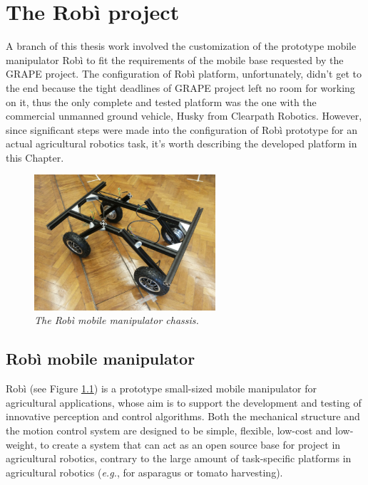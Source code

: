 
\chapter{The Robì project}\label{chap:robìProject}

A branch of this thesis work involved the customization of the prototype mobile manipulator Robì \parencite{robi} to fit the requirements of the mobile base requested by the \ac{GRAPE} project. The configuration of Robì platform, unfortunately, didn't get to the end because the tight deadlines of \ac{GRAPE} project left no room for working on it, thus the only complete and tested platform was the one with the commercial unmanned ground vehicle, Husky from Clearpath Robotics. However, since significant steps were made into the configuration of Robì prototype for an actual agricultural robotics task, it's worth describing the developed platform in this Chapter.

\begin{figure}
	\centering
	\includegraphics[width=0.6\textwidth]{Images/robi/robi_inizio.png}
	\caption{\textit{The Robì mobile manipulator chassis.}}
	\label{fig:robiDefault}
\end{figure}


\section{Robì mobile manipulator}\label{sec:robiDescr}
Robì (see Figure \ref{fig:robiDefault}) is a prototype small-sized mobile manipulator for agricultural applications, whose aim is to support the development and testing of innovative perception and control algorithms. Both the mechanical structure and the motion control system are designed to be simple, flexible, low-cost and low-weight, to create a system that can act as an open source base for project in agricultural robotics, contrary to the large amount of task-specific platforms in agricultural robotics (\textit{e.g.}, for asparagus \parencite{asparagi} or tomato \parencite{pomodori} harvesting).


